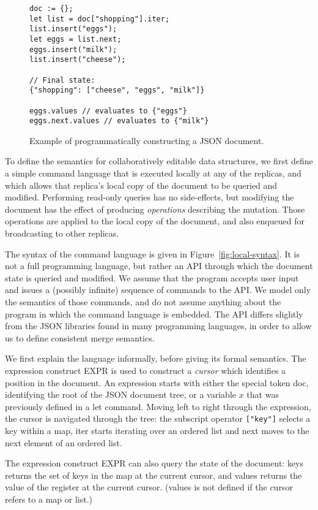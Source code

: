\documentclass[10pt,journal,compsoc]{IEEEtran}
\begin{document}
\begin{figure}
\centering
\begin{verbatim}
doc := {};
let list = doc["shopping"].iter;
list.insert("eggs");
let eggs = list.next;
eggs.insert("milk");
list.insert("cheese");

// Final state:
{"shopping": ["cheese", "eggs", "milk"]}

eggs.values // evaluates to {"eggs"}
eggs.next.values // evaluates to {"milk"}
\end{verbatim}
\caption{Example of programmatically constructing a JSON document.}\label{fig:make-doc}
\end{figure}

To define the semantics for collaboratively editable data structures, we first define a simple command language that is executed locally at any of the replicas, and which allows that replica's local copy of the document to be queried and modified. Performing read-only queries has no side-effects, but modifying the document has the effect of producing \emph{operations} describing the mutation. Those operations are applied to the local copy of the document, and also enqueued for broadcasting to other replicas.

The syntax of the command language is given in Figure~\ref{fig:local-syntax}. It is not a full programming language, but rather an API through which the document state is queried and modified. We assume that the program accepts user input and issues a (possibly infinite) sequence of commands to the API. We model only the semantics of those commands, and do not assume anything about the program in which the command language is embedded. The API differs slightly from the JSON libraries found in many programming languages, in order to allow us to define consistent merge semantics.

We first explain the language informally, before giving its formal semantics. The expression construct EXPR is used to construct a \emph{cursor} which identifies a position in the document. An expression starts with either the special token \textsf{doc}, identifying the root of the JSON document tree, or a variable $x$ that was previously defined in a \textsf{let} command. Moving left to right through the expression, the cursor is navigated through the tree: the subscript operator \verb|["key"]| selects a key within a map, \textsf{iter} starts iterating over an ordered list and \textsf{next} moves to the next element of an ordered list.

The expression construct EXPR can also query the state of the document: \textsf{keys} returns the set of keys in the map at the current cursor, and \textsf{values} returns the value of the register at the current cursor. (\textsf{values} is not defined if the cursor refers to a map or list.)
\end{document}
